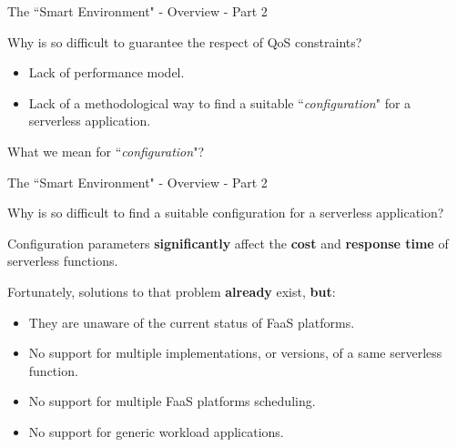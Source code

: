 \documentclass[13.5pt]{beamer}
\begin{document}
\begin{frame}{The ``Smart Environment" - Overview - Part 2}
	
	\begin{block}{}
		Why is so difficult to guarantee the respect of QoS constraints?
	\end{block}
	
	\begin{itemize}
		\item Lack of performance model.
		\item Lack of a methodological way to find a suitable ``\textit{configuration}" for a serverless application.
	\end{itemize}

	\begin{block}{}
		What we mean for ``\textit{configuration}"?
	\end{block}

\end{frame} 
\begin{frame}{The ``Smart Environment" - Overview - Part 2}
	
	\begin{block}{}
		Why is so difficult to find a suitable configuration for a serverless application?
	\end{block}
	\vspace{\baselineskip}
	Configuration parameters \textbf{significantly} affect the \textbf{cost} and \textbf{response time} of serverless functions.
	
\end{frame} 
\begin{frame}

Fortunately, solutions to that problem \textbf{already} exist, \textbf{but}:
\vspace{\baselineskip}
\begin{itemize}
	\item They are unaware of the current status of FaaS platforms.
	\item No support for multiple implementations, or versions, of a same serverless function.
	\item No support for multiple FaaS platforms scheduling.
	\item No support for generic workload applications.
\end{itemize}

\end{frame} 
\end{document}
